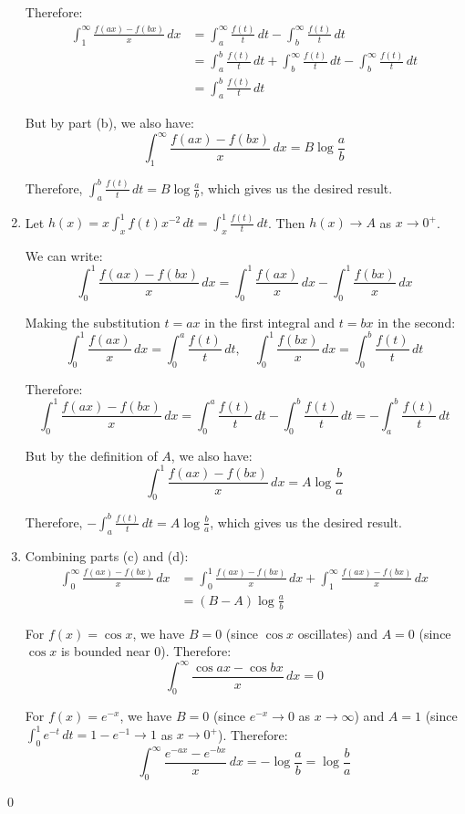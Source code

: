 \begin{enumerate}[label=(\alph*)]
Therefore:
\begin{align*}
\int_{1}^{\infty} \frac{f(ax) - f(bx)}{x} \, dx &= \int_{a}^{\infty} \frac{f(t)}{t} \, dt - \int_{b}^{\infty} \frac{f(t)}{t} \, dt \\
&= \int_{a}^{b} \frac{f(t)}{t} \, dt + \int_{b}^{\infty} \frac{f(t)}{t} \, dt - \int_{b}^{\infty} \frac{f(t)}{t} \, dt \\
&= \int_{a}^{b} \frac{f(t)}{t} \, dt
\end{align*}

But by part (b), we also have:
\[\int_{1}^{\infty} \frac{f(ax) - f(bx)}{x} \, dx = B \log \frac{a}{b}\]

Therefore, $\int_{a}^{b} \frac{f(t)}{t} \, dt = B \log \frac{a}{b}$, which gives us the desired result.

\item Let $h(x) = x \int_{x}^{1} f(t)x^{-2} \, dt = \int_{x}^{1} \frac{f(t)}{t} \, dt$. Then $h(x) \to A$ as $x \to 0^+$.

We can write:
\[\int_{0}^{1} \frac{f(ax) - f(bx)}{x} \, dx = \int_{0}^{1} \frac{f(ax)}{x} \, dx - \int_{0}^{1} \frac{f(bx)}{x} \, dx\]

Making the substitution $t = ax$ in the first integral and $t = bx$ in the second:
\[\int_{0}^{1} \frac{f(ax)}{x} \, dx = \int_{0}^{a} \frac{f(t)}{t} \, dt, \quad \int_{0}^{1} \frac{f(bx)}{x} \, dx = \int_{0}^{b} \frac{f(t)}{t} \, dt\]

Therefore:
\[\int_{0}^{1} \frac{f(ax) - f(bx)}{x} \, dx = \int_{0}^{a} \frac{f(t)}{t} \, dt - \int_{0}^{b} \frac{f(t)}{t} \, dt = -\int_{a}^{b} \frac{f(t)}{t} \, dt\]

But by the definition of $A$, we also have:
\[\int_{0}^{1} \frac{f(ax) - f(bx)}{x} \, dx = A \log \frac{b}{a}\]

Therefore, $-\int_{a}^{b} \frac{f(t)}{t} \, dt = A \log \frac{b}{a}$, which gives us the desired result.

\item Combining parts (c) and (d):
\begin{align*}
\int_{0}^{\infty} \frac{f(ax) - f(bx)}{x} \, dx &= \int_{0}^{1} \frac{f(ax) - f(bx)}{x} \, dx + \int_{1}^{\infty} \frac{f(ax) - f(bx)}{x} \, dx \\
&= (B - A) \log \frac{a}{b}
\end{align*}

For $f(x) = \cos x$, we have $B = 0$ (since $\cos x$ oscillates) and $A = 0$ (since $\cos x$ is bounded near 0). Therefore:
\[\int_{0}^{\infty} \frac{\cos ax - \cos bx}{x} \, dx = 0\]

For $f(x) = e^{-x}$, we have $B = 0$ (since $e^{-x} \to 0$ as $x \to \infty$) and $A = 1$ (since $\int_{0}^{1} e^{-t} \, dt = 1 - e^{-1} \to 1$ as $x \to 0^+$). Therefore:
\[\int_{0}^{\infty} \frac{e^{-ax} - e^{-bx}}{x} \, dx = -\log \frac{a}{b} = \log \frac{b}{a}\]
\end{enumerate}\qed

